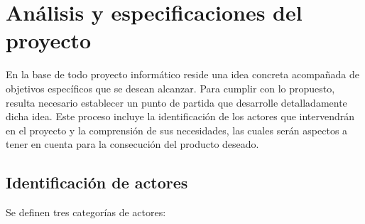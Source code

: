 \chapter{Análisis y especificaciones del proyecto}

En la base de todo proyecto informático reside una idea concreta acompañada de objetivos específicos que se desean alcanzar. Para cumplir con lo propuesto, resulta necesario establecer un punto de partida que desarrolle detalladamente dicha idea. Este proceso incluye la identificación de los actores que intervendrán en el proyecto y la comprensión de sus necesidades, las cuales serán aspectos a tener en cuenta para la consecución del producto deseado.

\section{Identificación de actores}
Se definen tres categorías de actores:
